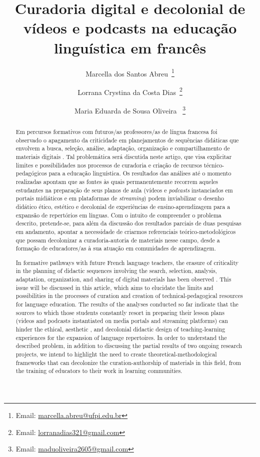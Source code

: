 \documentclass[portuguese]{textolivre}
\title{Curadoria digital e decolonial de vídeos e podcasts na educação linguística em francês}
\author[1]{Marcella dos Santos Abreu~\orcid{0000-0003-1293-4786}\thanks{Email: \href{mailto:marcella.abreu@ufpi.edu.br}{marcella.abreu@ufpi.edu.br}}}
\author[1]{Lorrana Crystina da Costa Dias~\orcid{0000-0001-9491-4353}\thanks{Email: \href{mailto:lorranadias321@gmail.com}{lorranadias321@gmail.com}}}
\author[1]{Maria Eduarda de Sousa Oliveira ~\orcid{0009-0008-1045-7107}\thanks{Email: \href{mailto:maduoliveira2605@gmail.com}{maduoliveira2605@gmail.com}}}
\affil[1]{Universidade Federal do Piauí, Centro de Ciências Humanas e Letras, Teresina, PI, Brasil.}
\begin{document}
\maketitle

\begin{polyabstract}
\begin{abstract}
Em percursos formativos com futuros/as professores/as de língua francesa foi
observado o apagamento da criticidade em planejamentos de sequências didáticas
que envolvem a busca, seleção, análise, adaptação, organização e
compartilhamento de materiais digitais \cite{deschaine_five_2015}. Tal
problemática será discutida neste artigo, que visa explicitar limites e
possibilidades nos processos de curadoria e criação de recursos
técnico-pedagógicos para a educação linguística. Os resultados das análises até
o momento realizadas apontam que as fontes às quais permanentemente recorrem
aqueles estudantes na preparação de seus planos de aula (vídeos e
\textit{podcasts} instanciados em portais midiáticos e em plataformas de
\textit{streaming}) podem inviabilizar o desenho didático ético, estético
\cite{rocha_moocs_2019} e decolonial \cite{veronelli_sobre_2021} de
experiências de ensino-aprendizagem para a expansão de repertórios em línguas.
Com o intuito de compreender o problema descrito, pretende-se, para além da
discussão dos resultados parciais de duas pesquisas em andamento, apontar a
necessidade de criarmos referenciais teórico-metodológicos que possam
decolonizar a curadoria-autoria de materiais nesse campo, desde a formação de
educadores/as à sua atuação em comunidades de aprendizagem.

\end{abstract}

\begin{english}
\begin{abstract}
In formative pathways with future French language teachers, the erasure of
criticality in the planning of didactic sequences involving the search,
selection, analysis, adaptation, organization, and sharing of digital materials
has been observed \cite{deschaine_five_2015}. This issue will be discussed in
this article, which aims to elucidate the limits and possibilities in the
processes of curation and creation of technical-pedagogical resources for
language education. The results of the analyses conducted so far indicate that
the sources to which those students constantly resort in preparing their lesson
plans (videos and podcasts instantiated on media portals and streaming
platforms) can hinder the ethical, aesthetic \cite{rocha_moocs_2019}, and
decolonial \cite{veronelli_sobre_2021} didactic design of teaching-learning
experiences for the expansion of language repertoires. In order to understand
the described problem, in addition to discussing the partial results of two
ongoing research projects, we intend to highlight the need to create
theoretical-methodological frameworks that can decolonize the
curation-authorship of materials in this field, from the training of educators
to their work in learning communities.


\end{abstract}
\end{english}
\end{polyabstract}
\end{document}
